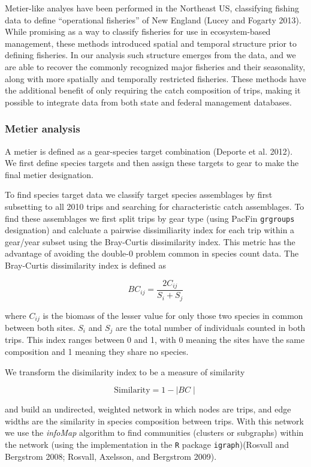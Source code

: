 \documentclass[]{article}
\begin{document}
Metier-like analyes have been performed in the Northeast US, classifying
fishing data to define ``operational fisheries'' of New England (Lucey
and Fogarty 2013). While promising as a way to classify fisheries for
use in ecosystem-based management, these methods introduced spatial and
temporal structure prior to defining fisheries. In our analysis such
structure emerges from the data, and we are able to recover the commonly
recognized major fisheries and their seasonality, along with more
spatially and temporally restricted fisheries. These methods have the
additional benefit of only requiring the catch composition of trips,
making it possible to integrate data from both state and federal
management databases.

\subsubsection{Metier analysis}\label{metier-analysis}

A metier is defined as a gear-species target combination (Deporte et al.
2012). We first define species targets and then assign these targets to
gear to make the final metier designation.

To find species target data we classify target species assemblages by
first subsetting to all 2010 trips and searching for characteristic
catch assemblages. To find these assemblages we first split trips by
gear type (using PacFin \texttt{grgroups} designation) and calcluate a
pairwise dissimiliarity index for each trip within a gear/year subset
using the Bray-Curtis dissimilarity index. This metric has the advantage
of avoiding the double-0 problem common in species count data. The
Bray-Curtis dissimilarity index is defined as

\[ BC_{ij} = \frac{2C_{ij}}{S_i+S_j} \]

where $C_{ij}$ is the biomass of the lesser value for only those two
species in common between both sites. $S_i$ and $S_j$ are the total
number of individuals counted in both trips. This index ranges between 0
and 1, with 0 meaning the sites have the same composition and 1 meaning
they share no species.

We transform the disimilarity index to be a measure of similarity

\[ \text{Similarity}= 1 - \mid BC\mid \]

and build an undirected, weighted network in which nodes are trips, and
edge widths are the similarity in species composition between trips.
With this network we use the \emph{infoMap} algorithm to find
communities (clusters or subgraphs) within the network (using the
implementation in the \texttt{R} package \texttt{igraph})(Rosvall and
Bergstrom 2008; Rosvall, Axelsson, and Bergstrom 2009).
\end{document}
